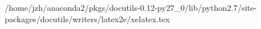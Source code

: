 /home/jzh/anaconda2/pkgs/docutils-0.12-py27_0/lib/python2.7/site-packages/docutils/writers/latex2e/xelatex.tex
